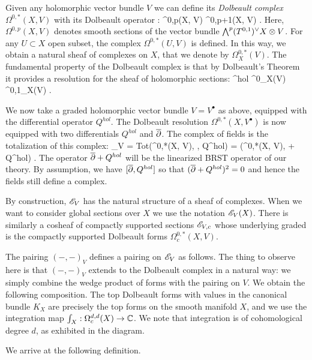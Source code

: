 \documentclass[10pt]{amsart}
\begin{document}
Given any holomorphic vector bundle $V$ we can define its {\em Dolbeault complex} $\Omega^{0,*}(X , V)$ with its Dolbeault operator 
\ben
\dbar : \Omega^{0,p}(X, V) \to \Omega^{0,p+1}(X, V) .
\een
Here, $\Omega^{0,p}(X, V)$ denotes smooth sections of the vector bundle $\bigwedge^p (T^{0,1})^{\vee} X \otimes V$. 
For any $U \subset X$ open subset, the complex $\Omega^{0,*}(U,V)$ is defined. 
In this way, we obtain a natural sheaf of complexes on $X$, that we denote by $\Omega^{0,*}_X(V)$. 
The fundamental property of the Dolbeault complex is that by Dolbeault's Theorem it provides a resolution for the sheaf of holomorphic sections: 
\ben
\sV^{hol} \to \Omega^0_X(V) \xto{\dbar} \Omega^{0,1}_X(V) \xto{\dbar} \cdots .
\een 

We now take a graded holomorphic vector bundle $V = V^{\bullet}$ as above, equipped with the differential operator $Q^{hol}$. 
The Dolbeault resolution $\Omega^{0,*}(X, V^\bullet)$ is now equipped with two differentials $Q^{hol}$ and $\overline{\partial}$. 
The complex of fields is the totalization of this complex:
\ben
\sE_V = {\rm Tot}\left(\Omega^{0,*}(X, V), \dbar, Q^{hol}\right) = \left(\Omega^{0,*}(X, V), \dbar + Q^{hol}\right) .
\een
The operator $\overline{\partial} + Q^{hol}$ will be the linearized BRST operator of our theory.
By assumption, we have $[\overline{\partial}, Q^{hol}]$ so that $(\overline{\partial} + Q^{hol})^2 = 0$ and hence the fields still define a complex. 

By construction, $\mathscr E_V$ has the natural structure of a sheaf of complexes.
When we want to consider global sections over $X$ we use the notation $\mathscr E_V(X)$. 
There is similarly a cosheaf of compactly supported sections $\mathscr E_{V,c}$ whose underlying graded is the compactly supported Dolbeault forms $\Omega^{0,*}_c(X, V)$. 

The pairing $(-,-)_V$ defines a pairing on $\mathscr E_V$ as follows.
The thing to observe here is that $(-,-)_V$ extends to the Dolbeault complex in a natural way: we simply combine the wedge product of forms with the pairing on $V$.
We obtain the following composition. 
\ben
{}
\een
The top Dolbeault forms with values in the canonical bundle $K_X$ are precisely the top forms on the smooth manifold $X$, and we use the integration map $\int_X : \Omega^{d,d}_c(X) \to \mathbb C$. 
We note that integration is of cohomological degree $d$, as exhibited in the diagram. 

We arrive at the following definition. 
\end{document}
